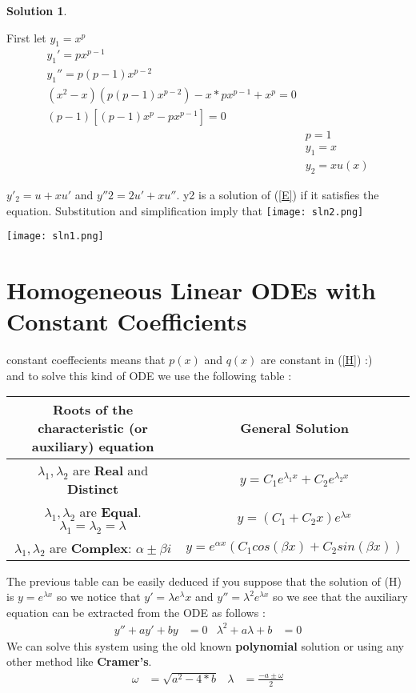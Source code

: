 \documentclass[11pt]{article}
\theoremstyle{definition}
\newtheorem{sln}{Solution}
\begin{document}
\begin{sln}
\begin{shaded}
First let $y_1 = x^p$ \\
\begin{equation}
\begin{split}
y_1' = px^{p-1}  \\
y_1'' = p (p-1) x^{p-2}\\
   (x^2-x)( p (p-1) x^{p-2}) -x * px^{p-1} + x^p =0\\
   (p-1) [(p-1)x^p-px^{p-1}]=0 \\ 
   &p=1 \\
   &y_1 = x\\
  &y_2 = x u(x) 
   \end{split}
\end{equation}
\end{shaded}
$y'_2 = u + xu'$ and $y''2 = 2u' + xu''$.
y2 is a solution of (\ref{E}) if it satisfies the equation. Substitution and simplification imply that
\texttt{[image: sln2.png]}\\
\begin{center}
    \texttt{[image: sln1.png]}
\end{center}
\end{sln}
\section{Homogeneous Linear ODEs with Constant Coefficients}
constant coeffecients means that $p(x)$ and $q(x)$ are constant in (\ref{H}) :) \\
and to solve this kind of ODE we use the following table :
\begin{center}
    \begin{tabular}{c|c}
       Roots of the \textbf{characteristic (or auxiliary)} equation   & General Solution \\
       \hline
        $\lambda_1, \lambda_2$ are \textbf{Real} and \textbf{Distinct}  & $y = C_1 e^{\lambda_1 x} + C_2 e^{\lambda_2 x}$\\
        \hline
        $\lambda_1, \lambda_2$ are \textbf{Equal}. $\lambda_1 = \lambda_2 =\lambda$ & $y = (C_1 + C_2 x) e^{\lambda x}$  \\
        \hline
        $\lambda_1, \lambda_2$ are \textbf{Complex}: $\alpha \pm \beta i$ & $y=e^{\alpha x} (C_1 cos(\beta x) + C_2 sin(\beta x))$
    \end{tabular}
\end{center}
The previous table can be easily deduced if you suppose that the solution of (H) is $y = e^{\lambda x}$ so we notice that $ y' = \lambda e^ \lambda x $ and $y'' = \lambda^2 e^ {\lambda x}$ so we see that the auxiliary equation can be extracted from the ODE as follows : 
\begin{align*}
    y'' + ay'+by &= 0 &
    \lambda^2 + a\lambda + b&=0 
    \end{align*}
    We can solve this system using the old known \textbf{polynomial} solution or using any other method like \textbf{Cramer's}. 
    \begin{align*}
    \omega &= \sqrt{a^2-4*b} &
    \lambda &= \frac{-a \pm \omega}{2}
    \end{align*}
\end{document}
